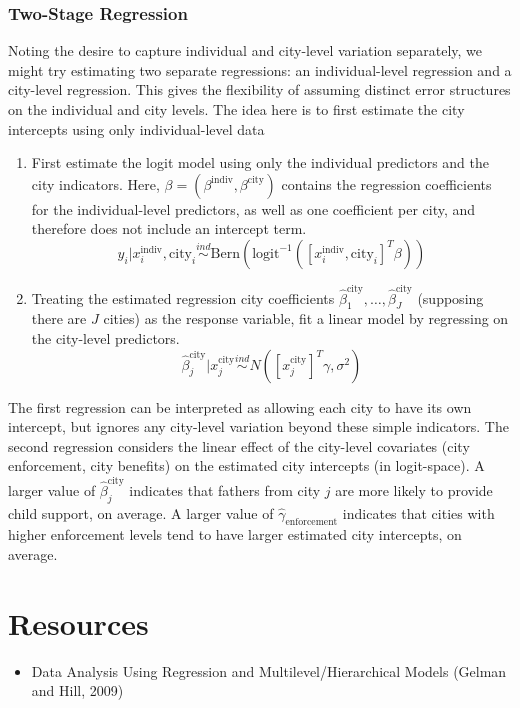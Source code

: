 \documentclass[12pt]{article}
\begin{document}
\subsubsection{Two-Stage Regression}
Noting the desire to capture individual and city-level variation separately, we might try estimating two separate regressions: an individual-level regression and a city-level regression. This gives the flexibility
of assuming distinct error structures on the individual and city levels. The idea here is to first estimate the city intercepts using only individual-level data 
\begin{enumerate}
\item First estimate the logit model using only the individual predictors and the city indicators. Here, $\beta = (\beta^{\text{indiv}}, \beta^{\text{city}})$ contains the regression coefficients for the individual-level 
predictors, as well as one coefficient per city, and therefore does not include an intercept term. 
\[y_i|x_i^{\text{indiv}}, \text{city}_i \overset{ind}{\sim} \text{Bern}(\text{logit}^{-1}([x_i^{\text{indiv}}, \text{city}_i]^T \beta)) \]
\item Treating the estimated regression city coefficients $\hat{\beta}^{\text{city}}_1, \dots, \hat{\beta}^{\text{city}}_J$ (supposing there are $J$ cities) as the response variable, fit a linear model by regressing on the 
city-level predictors. 
\[\hat{\beta}^{\text{city}}_j|x_j^{\text{city}} \overset{ind}{\sim} N([x_j^{\text{city}}]^T \gamma, \sigma^2)\]
\end{enumerate}
The first regression can be interpreted as allowing each city to have its own intercept, but ignores any city-level variation beyond these simple indicators. The second regression considers the linear effect of 
the city-level covariates (city enforcement, city benefits) on the estimated city intercepts (in logit-space). A larger value of $\hat{\beta}^{\text{city}}_j$ indicates that fathers from city $j$ are more likely to provide child support, on average. A larger value of $\hat{\gamma}_{\text{enforcement}}$ indicates that cities with higher enforcement levels tend to have larger estimated city intercepts, on average. 


\section{Resources}
\begin{itemize}
\item Data Analysis Using Regression and Multilevel/Hierarchical Models (Gelman and Hill, 2009)
\end{itemize}
\end{document}
